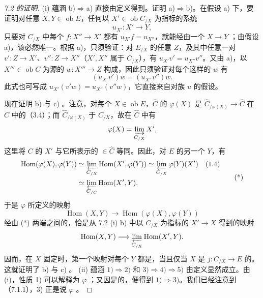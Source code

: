 \begin{proof}[7.2 的证明]
(i) 蕴涵 b)$\Rightarrow$a) 直接由定义得到。证明 a)$\Rightarrow$b)。在假设 a) 下，要证明对任意 $X,Y\in\operatorname{ob}E$，任何以 $X'\in\operatorname{ob}C_{/X}$ 为指标的系统
\[
u_{X'}:X'\longrightarrow Y,
\]
只要对 $C_{/X}$ 中每个 $f:X''\to X'$ 都有 $u_{X'}f=u_{X''}$，就能经由一个 $X\to Y$ ；由假设 a)，该必然唯一。根据 a)，只须验证：对 $E_{/X}$ 的任意 $Z$，及其中任意一对 $v':Z\to X'$、$v'':Z\to X''$（$X',X''$ 属于 $C_{/X}$），有 $u_{X'}v'=u_{X''}v''$。又由 a)，以 $X'''\in\operatorname{ob}C$ 为源的 $w:X'''\to Z$ 构成，因此只须验证对每个这样的 $w$ 有
\[
(u_{X'}v')w=(u_{X''}v'')w.
\]
此式也可写成 $u_{X'}(v'w)=u_{X''}(v''w)$，它直接来自对族 $u$ 的假设。

现在证明 b) 与 c) 。注意，对每个 $X\in\operatorname{ob}E$，$\widehat C$ 的 $\varphi(X)$ 是 $\widehat C_{/\varphi(X)}\to\widehat C$ 在 $\widehat C$ 中的（3.4）；而 $\widehat C_{/\varphi(X)}$ 于 $C_{/X}$，故在 $\widehat C$ 中有
\[
\varphi(X)=\varinjlim_{C_{/X}}X',
\]
这里将 $C$ 的 $X'$ 与它所表示的 $\in\widehat C$ 等同。因此，对 $E$ 的另一个 $Y$，有
\[
\begin{aligned}
\operatorname{Hom}(\varphi(X),\varphi(Y))
&\simeq\varprojlim_{C_{/X}}\operatorname{Hom}(X',\varphi(Y))
\simeq\varprojlim_{C_{/X}}\varphi(Y)(X')\quad(1.4)\\
&\simeq\varprojlim_{C_{/C}}\operatorname{Hom}(X',Y).
\end{aligned}\tag{*}
\]
于是 $\varphi$ 所定义的映射
\[
\operatorname{Hom}(X,Y)\longrightarrow\operatorname{Hom}(\varphi(X),\varphi(Y))
\]
经由 (*) 两端之间的，恰是从 7.2 (i) b) 中以 $C_{/X}$ 为指标的 $X'\to X$ 得到的映射
\[
\operatorname{Hom}(X,Y)\longrightarrow\varprojlim_{C_{/X}}\operatorname{Hom}(X',Y).
\]
因而，在 $X$ 固定时，第一个映射对每个 $Y$ 都是，当且仅当 $X$ 是 $j:C_{/X}\to E$ 的。这就证明了 b) 与 c) 。
(ii) 蕴涵 $1)\Rightarrow2)$ 和 $3)\Rightarrow4)\Rightarrow5)$ 由定义显然成立。由 (i)，性质 1) 可以解释为 $\varphi$ ；又因是的，便得到 $1)\Rightarrow3)$。我们已经注意到（7.1.1），3) 正是说 $\varphi$ 。


\end{proof}
